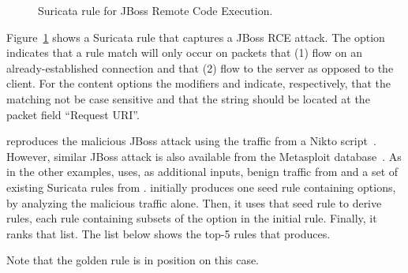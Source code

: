 \documentclass[sigconf,review, anonymous]{acmart}
\begin{document}
\begin{figure}[H]
  
  \caption{\label{fig:rule-jboss}Suricata rule for JBoss Remote Code Execution.}
\end{figure}


Figure~\ref{fig:rule-jboss} shows a Suricata rule that captures a
JBoss RCE attack.  The option 
indicates that a rule match will only occur on packets that (1) flow
on an already-established connection and that (2) flow to the server
as opposed to the client. For the content options the modifiers
 and  indicate, respectively, that
the matching not be case sensitive and that the string should be
located at the packet field ``Request URI''. 

\tname{} reproduces the malicious JBoss attack using the traffic from
a Nikto script~\cite{nikto}. However, similar JBoss attack is also
available from the Metasploit database~\cite{metasploit}. As in the
other examples, \tname{} uses, as additional inputs, benign traffic
from  and a set of existing Suricata rules from
. \tname{} initially produces one seed rule containing
 options, by analyzing the malicious traffic alone. Then, it
uses that seed rule to derive  rules, each rule containing
subsets of the option in the initial rule. Finally, it ranks that
list. The list below shows the top-5 rules that \tname{}
produces.


Note that the golden rule is in position  on this
case. 
\end{document}
